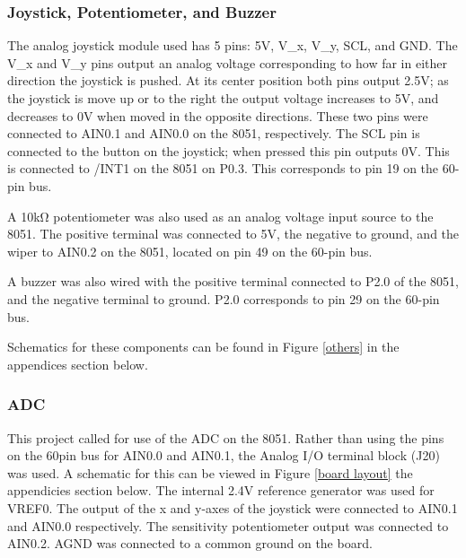 \documentclass[12pt]{article}
\begin{document}
	\subsubsection{Joystick, Potentiometer, and Buzzer}
	The analog joystick module used has 5 pins: 5\si{V}, V\_x, V\_y, SCL, and GND. The V\_x and V\_y pins output an analog voltage corresponding to how far in either direction the joystick is pushed. At its center position both pins output 2.5\si{V}; as the joystick is move up or to the right the output voltage increases to 5V, and decreases to 0V when moved in the opposite directions. These two pins were connected to AIN0.1 and AIN0.0 on the 8051, respectively. The SCL pin is connected to the button on the joystick; when pressed this pin outputs 0\si{V}. This is connected to /INT1 on the 8051 on P0.3. This corresponds to pin 19 on the 60-pin bus. 
	
	A 10k\si{\ohm} potentiometer was also used as an analog voltage input source to the 8051. The positive terminal was connected to 5\si{V}, the negative to ground, and the wiper to AIN0.2 on the 8051, located on pin 49 on the 60-pin bus. 
	
	A buzzer was also wired with the positive terminal connected to P2.0 of the 8051, and the negative terminal to ground. P2.0 corresponds to pin 29 on the 60-pin bus. 
	
	Schematics for these components can be found in Figure \ref{others} in the appendices section below. 
	
	\subsubsection{ADC}
	This project called for use of the ADC on the 8051. Rather than using the pins on the 60pin bus for AIN0.0 and AIN0.1, the Analog I/O terminal block (J20) was used. A schematic for this can be viewed in Figure \ref{board layout} the appendicies section below. The internal 2.4\si{V} reference generator was used for VREF0. The output of the x and y-axes of the joystick were connected to AIN0.1 and AIN0.0 respectively. The sensitivity potentiometer output was connected to AIN0.2. AGND was connected to a common ground on the board. 
	
\end{document}
